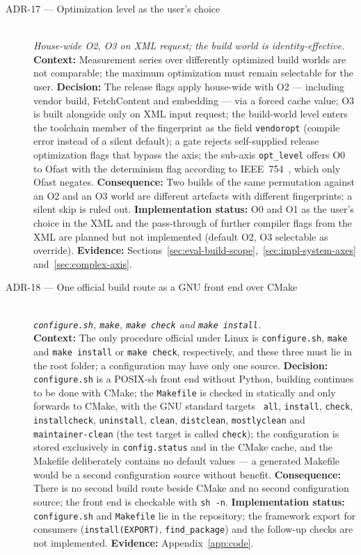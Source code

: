 \begin{description}
  \item[ADR-17 --- Optimization level as the user's choice]\hfill\\
  \emph{House-wide O2, O3 on XML request; the build world is identity-effective.}\hfill\\
  \textbf{Context:} Measurement series over differently optimized build worlds are not
  comparable; the maximum optimization must remain selectable for the user.
  \textbf{Decision:} The release flags apply house-wide with O2 --- including vendor build,
  FetchContent and embedding --- via a forced cache value; O3 is built alongside only on XML input
  request; the build-world level enters the toolchain member of the fingerprint as the field
  \texttt{vendoropt} (compile error instead of a silent default); a gate rejects self-supplied
  release optimization flags that bypass the axis; the sub-axis \texttt{opt\_level} offers O0 to
  Ofast with the determinism flag according to IEEE~754~\cite{ieee754_2019}, which only Ofast
  negates.
  \textbf{Consequence:} Two builds of the same permutation against an O2 and an O3 world are
  different artefacts with different fingerprints; a silent skip is ruled out.
  \textbf{Implementation status:} O0 and O1 as the user's choice in the XML and the pass-through of
  further compiler flags from the XML are planned but not implemented (default O2, O3 selectable
  as override).
  \textbf{Evidence:} Sections~\ref{sec:eval-build-scope},~\ref{sec:impl-system-axes}
  and~\ref{sec:complex-axis}.

  \item[ADR-18 --- One official build route as a GNU front end over CMake]\hfill\\
  \emph{\texttt{configure.sh}, \texttt{make}, \texttt{make check} and \texttt{make install}.}\hfill\\
  \textbf{Context:} The only procedure official under Linux is \texttt{configure.sh},
  \texttt{make} and \texttt{make install} or \texttt{make check}, respectively, and these three
  must lie in the root folder; a configuration may have only one source.
  \textbf{Decision:} \texttt{configure.sh} is a POSIX-sh front end without Python, building
  continues to be done with CMake; the \texttt{Makefile} is checked in statically and only
  forwards to CMake, with the GNU standard targets~\cite{gnu2026standards} \texttt{all},
  \texttt{install}, \texttt{check}, \texttt{installcheck}, \texttt{uninstall}, \texttt{clean},
  \texttt{distclean}, \texttt{mostlyclean} and \texttt{maintainer-clean} (the test target is called
  \texttt{check}); the configuration is stored exclusively in \texttt{config.status} and in the
  CMake cache, and the Makefile deliberately contains no default values --- a generated Makefile
  would be a second configuration source without benefit.
  \textbf{Consequence:} There is no second build route beside CMake and no second configuration
  source; the front end is checkable with \texttt{sh -n}.
  \textbf{Implementation status:} \texttt{configure.sh} and \texttt{Makefile} lie in the
  repository; the framework export for consumers (\texttt{install(EXPORT)},
  \texttt{find\_package}) and the follow-up checks are not implemented.
  \textbf{Evidence:} Appendix~\ref{app:code}.


\end{description}
